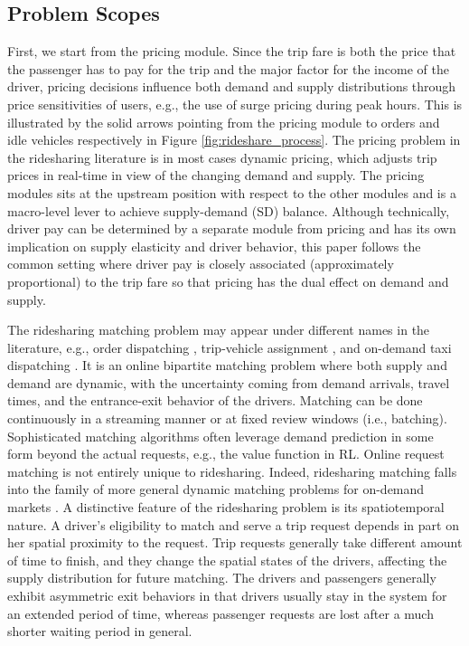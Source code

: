 \documentclass{article}
\newcommand{\tq}[1]{\textcolor{red}{#1}}
\begin{document}
\subsection{Problem Scopes}\label{sec:scope}
First, we start from the pricing module.
Since the trip fare is both the price that the passenger has to pay for the trip and the major factor for the income of the driver, pricing decisions influence both demand and supply distributions through price sensitivities of users, e.g., the use of surge pricing during peak hours. This is illustrated by the solid arrows pointing from the pricing module to orders and idle vehicles respectively in Figure \ref{fig:rideshare_process}.
The pricing problem in the ridesharing literature is in most cases dynamic pricing, which adjusts trip prices in real-time in view of the changing demand and supply. The pricing modules sits at the upstream position with respect to the other modules and is a macro-level lever to achieve supply-demand (SD) balance. Although technically, driver pay can be determined by a separate module from pricing and has its own implication on supply elasticity and driver behavior, this paper follows the common setting where driver pay is closely associated (approximately proportional) to the trip fare so that pricing has the dual effect on demand and supply.

The ridesharing matching problem \citep{yan2020dynamic,ozkan2017dynamic,qin2020ride} may appear under different names in the literature, e.g., order dispatching \citep{qin2020ride}, trip-vehicle assignment \citep{bei2018algorithms}, and on-demand taxi dispatching \citep{tong2020spatial}. 
It is an online bipartite matching problem where both supply and demand are dynamic, with the uncertainty coming from demand arrivals, travel times, and the entrance-exit behavior of the drivers. Matching can be done continuously in a streaming manner or at fixed review windows (i.e., batching). Sophisticated matching algorithms often leverage demand prediction in some form beyond the actual requests, e.g., the value function in RL.
Online request matching is not entirely unique to ridesharing. Indeed, ridesharing matching falls into the family of more general dynamic matching problems for on-demand markets \citep{hu2022dynamic}. A distinctive feature of the ridesharing problem is its spatiotemporal nature. A driver's eligibility to match and serve a trip request depends in part on her spatial proximity to the request. Trip requests generally take different amount of time to finish, and they change the spatial states of the drivers, affecting the supply distribution for future matching. The drivers and passengers generally exhibit asymmetric exit behaviors in that drivers usually stay in the system for an extended period of time, whereas passenger requests are lost after a much shorter waiting period in general. 
\end{document}
